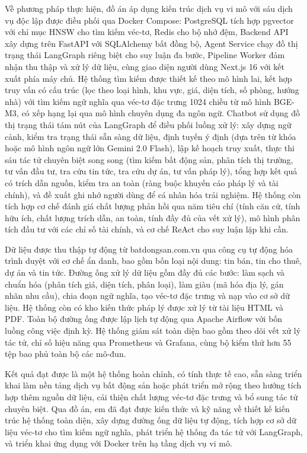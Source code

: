Về phương pháp thực hiện, đồ án áp dụng kiến trúc dịch vụ vi mô với sáu dịch vụ độc lập được điều phối qua Docker Compose: PostgreSQL tích hợp pgvector với chỉ mục HNSW cho tìm kiếm véc-tơ, Redis cho bộ nhớ đệm, Backend API xây dựng trên FastAPI với SQLAlchemy bất đồng bộ, Agent Service chạy đồ thị trạng thái LangGraph riêng biệt cho suy luận đa bước, Pipeline Worker đảm nhận thu thập và xử lý dữ liệu, cùng giao diện người dùng Next.js 16 với kết xuất phía máy chủ. Hệ thống tìm kiếm được thiết kế theo mô hình lai, kết hợp truy vấn có cấu trúc (lọc theo loại hình, khu vực, giá, diện tích, số phòng, hướng nhà) với tìm kiếm ngữ nghĩa qua véc-tơ đặc trưng 1024 chiều từ mô hình BGE-M3, có xếp hạng lại qua mô hình chuyên dụng đa ngôn ngữ. Chatbot sử dụng đồ thị trạng thái tám nút của LangGraph để điều phối luồng xử lý: xây dựng ngữ cảnh, kiểm tra trạng thái sẵn sàng dữ liệu, định tuyến ý định (dựa trên từ khóa hoặc mô hình ngôn ngữ lớn Gemini 2.0 Flash), lập kế hoạch truy xuất, thực thi sáu tác tử chuyên biệt song song (tìm kiếm bất động sản, phân tích thị trường, tư vấn đầu tư, tra cứu tin tức, tra cứu dự án, tư vấn pháp lý), tổng hợp kết quả có trích dẫn nguồn, kiểm tra an toàn (ràng buộc khuyến cáo pháp lý và tài chính), và đề xuất ghi nhớ người dùng để cá nhân hóa trải nghiệm. Hệ thống còn tích hợp cơ chế đánh giá chất lượng phản hồi qua năm tiêu chí (tính căn cứ, tính hữu ích, chất lượng trích dẫn, an toàn, tính đầy đủ của vết xử lý), mô hình phân tích đầu tư với các chỉ số tài chính, và cơ chế ReAct cho suy luận lặp khi cần.

Dữ liệu được thu thập tự động từ batdongsan.com.vn qua công cụ tự động hóa trình duyệt với cơ chế ẩn danh, bao gồm bốn loại nội dung: tin bán, tin cho thuê, dự án và tin tức. Đường ống xử lý dữ liệu gồm đầy đủ các bước: làm sạch và chuẩn hóa (phân tích giá, diện tích, phân loại), làm giàu (mã hóa địa lý, gán nhãn nhu cầu), chia đoạn ngữ nghĩa, tạo véc-tơ đặc trưng và nạp vào cơ sở dữ liệu. Hệ thống còn có kho kiến thức pháp lý được xử lý từ tài liệu HTML và PDF. Toàn bộ đường ống được lập lịch tự động qua Apache Airflow với bốn luồng công việc định kỳ. Hệ thống giám sát toàn diện bao gồm theo dõi vết xử lý tác tử, chỉ số hiệu năng qua Prometheus và Grafana, cùng bộ kiểm thử hơn 55 tệp bao phủ toàn bộ các mô-đun.

Kết quả đạt được là một hệ thống hoàn chỉnh, có tính thực tế cao, sẵn sàng triển khai làm nền tảng dịch vụ bất động sản hoặc phát triển mở rộng theo hướng tích hợp thêm nguồn dữ liệu, cải thiện chất lượng véc-tơ đặc trưng và bổ sung tác tử chuyên biệt. Qua đồ án, em đã đạt được kiến thức và kỹ năng về thiết kế kiến trúc hệ thống toàn diện, xây dựng đường ống dữ liệu tự động, tích hợp cơ sở dữ liệu véc-tơ cho tìm kiếm ngữ nghĩa, phát triển hệ thống đa tác tử với LangGraph, và triển khai ứng dụng với Docker trên hạ tầng dịch vụ vi mô.

